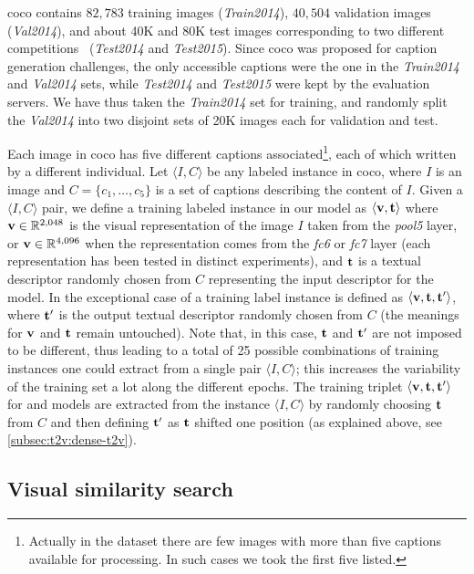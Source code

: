 \gls{coco} contains $82,783$ training images (\emph{Train2014}), $40,504$ validation images (\emph{Val2014}), and about 40K and 80K test images corresponding to two different competitions~\cite{chen2015microsoft} (\emph{Test2014} and \emph{Test2015}).
Since \gls{coco} was proposed for caption generation challenges, the only accessible captions were the one in the \emph{Train2014} and \emph{Val2014} sets, while \emph{Test2014} and \emph{Test2015} were kept by the evaluation servers.
We have thus taken the \emph{Train2014} set for training, and randomly split the \emph{Val2014} into two disjoint sets of 20K images each for validation and test.

Each image in \gls{coco} has five different captions associated\footnote{Actually in the dataset there are few images with more than five captions available for processing. In such cases we took the first five listed.}, each of which written by a different individual.
Let $\langle I, C \rangle$ be any labeled instance in \gls{coco}, where $I$ is an image and $C = \{ c_1, \ldots, c_5\}$ is a set of captions describing the content of $I$.
Given a $\langle I, C \rangle$ pair, we define a training labeled instance in our model as $\left \langle \mathbf{v},\mathbf{t} \right \rangle$ where $\mathbf{v} \in \mathbb{R}^{2,048}$ is the visual representation of the image $I$ taken from the \emph{pool5} layer, or $\mathbf{v} \in \mathbb{R}^{4,096}$ when the representation comes from the \emph{fc6} or \emph{fc7} layer (each representation has been tested in distinct experiments), and $\mathbf{t}$ is a textual descriptor randomly chosen from $C$ representing the input descriptor for the model.
In the exceptional case of \sparsettv{} a training label instance is defined as $\left \langle \mathbf{v}, \mathbf{t}, \mathbf{t}' \right\rangle$, where $\mathbf{t}'$ is the output textual descriptor randomly chosen from $C$ (the meanings for $\mathbf{v}$ and $\mathbf{t}$ remain untouched).
Note that, in this case, $\mathbf{t}$ and $\mathbf{t}'$ are not imposed to be different, thus leading to a total of 25 possible combinations of training instances one could extract from a single pair $\langle I, C \rangle$;
this increases the variability of the training set a lot along the different epochs.
The training triplet $\langle \mathbf{v}, \mathbf{t}, \mathbf{t}' \rangle$ for \densettv{} and \widedeepttv{} models are extracted from the instance $\langle I, C \rangle$ by randomly choosing $\mathbf{t}$ from $C$ and then defining $\mathbf{t}'$ as $\mathbf{t}$ shifted one position (as explained above, see \ref{subsec:t2v:dense-t2v}).


\subsection{Visual similarity search}

